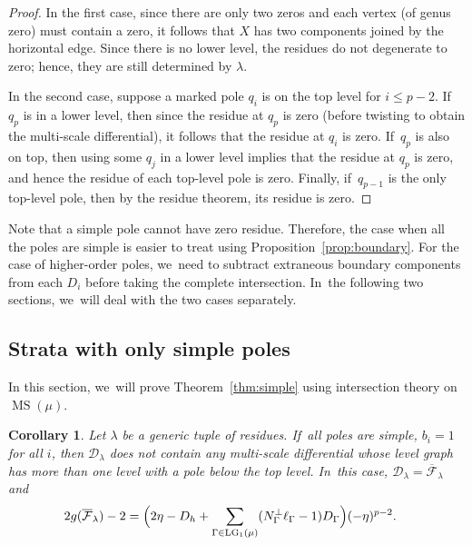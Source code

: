 \documentclass[JEP,XML,SOM,Unicode,NoFloatCountersInSection,published]{cedram}
\DeclareMathOperator\LG{LG}
\DeclareMathOperator\MS{MS}
\newtheorem{cor}[thm]{Corollary}
\theoremstyle{definition}
\begin{document}
\begin{proof}
In the first case, since there are only two zeros and each vertex (of genus zero) must contain a zero, it follows that $X$ has two components joined by the horizontal edge. Since there is no lower level, the residues do not degenerate to zero; hence, they are still determined by $\lambda$.

In the second case, suppose a marked pole $q_i$ is on the top level for $i\leq p-2$. If~$q_p$ is in a lower level, then since the residue at $q_p$ is zero (before twisting to obtain the multi-scale differential), it follows that the residue at $q_i$ is zero. If~$q_p$ is also on top, then using some $q_j$ in a lower level implies that the residue at $q_p$ is zero, and hence the residue of each top-level pole is zero. Finally, if~$q_{p-1}$ is the only top-level pole, then by the residue theorem, its residue is zero.
\end{proof}

Note that a simple pole cannot have zero residue. Therefore, the case when all the poles are simple is easier to treat using Proposition~\ref{prop:boundary}. For the case of higher-order poles, we~need to subtract extraneous boundary components from each $D_i$ before taking the complete intersection. In~the following two sections, we~will deal with the two cases separately.

\subsection{Strata with only simple poles}
\label{sec:simple}

In this section, we~will prove Theorem~\ref{thm:simple} using intersection theory on $\MS(\mu)$.

\begin{cor}
\label{cor:boundary-simple}
Let $\lambda$ be a generic tuple of residues. If~all poles are simple, \ie $b_i = 1$ for all $i$, then $\mathcal D_\lambda $ does not contain any multi-scale differential whose level graph has more than one level with a pole below the top level. In~this case, $\mathcal D_\lambda = \overline{\mathcal F}_\lambda$ and
\begin{align}
\label{eq:simple}
2g (\overline{\mathcal F}_\lambda) - 2 & = \Bigl( 2\eta - D_h + \sum_{\Gamma\in \LG_1(\mu)} (N_{\Gamma}^{\bot} \ell_\Gamma - 1) D_\Gamma \Bigr) (-\eta)^{p-2}.
\end{align}
\end{cor}
\end{document}
